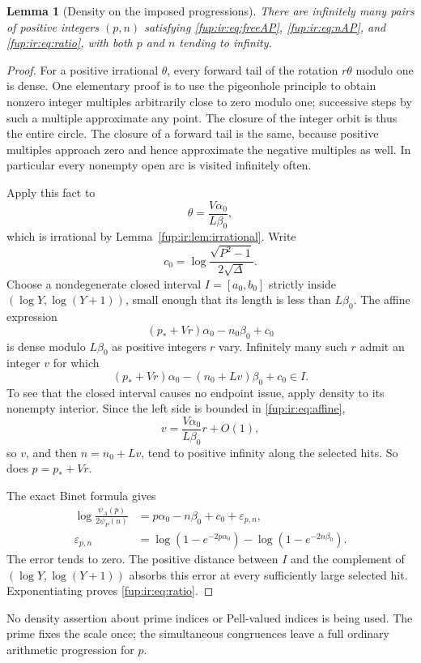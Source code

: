 \documentclass[11pt,letterpaper]{article}
\newtheorem{lemma}[theorem]{Lemma}
\theoremstyle{definition}\newtheorem{definition}[theorem]{Definition}
\theoremstyle{remark}\newtheorem{remark}[theorem]{Remark}
\begin{document}
\begin{lemma}[Density on the imposed progressions]\label{fup:ir:lem:ratio}
There are infinitely many pairs of positive integers $(p,n)$ satisfying \eqref{fup:ir:eq:freeAP}, \eqref{fup:ir:eq:nAP}, and \eqref{fup:ir:eq:ratio}, with both $p$ and $n$ tending to infinity.
\end{lemma}
\begin{proof}
For a positive irrational $\theta$, every forward tail of the rotation $r\theta$ modulo one is dense. One elementary proof is to use the pigeonhole principle to obtain nonzero integer multiples arbitrarily close to zero modulo one; successive steps by such a multiple approximate any point. The closure of the integer orbit is thus the entire circle. The closure of a forward tail is the same, because positive multiples approach zero and hence approximate the negative multiples as well. In particular every nonempty open arc is visited infinitely often.

Apply this fact to
\[
 \theta=\frac{V\alpha_0}{L\beta_0},
\]
which is irrational by Lemma~\ref{fup:ir:lem:irrational}. Write
\[
 c_0=\log\frac{\sqrt{P^2-1}}{2\sqrt\Delta}.
\]
Choose a nondegenerate closed interval $I=[a_0,b_0]$ strictly inside
$(\log Y,\log(Y+1))$, small enough that its length is less than $L\beta_0$. The affine expression
\[
 (p_*+Vr)\alpha_0-n_0\beta_0+c_0
\]
is dense modulo $L\beta_0$ as positive integers $r$ vary. Infinitely many such $r$ admit an integer $v$ for which
\begin{equation}\label{fup:ir:eq:affine}
 (p_*+Vr)\alpha_0-(n_0+Lv)\beta_0+c_0\in I.
\end{equation}
To see that the closed interval causes no endpoint issue, apply density to its nonempty interior. Since the left side is bounded in \eqref{fup:ir:eq:affine},
\[
 v=\frac{V\alpha_0}{L\beta_0}r+O(1),
\]
so $v$, and then $n=n_0+Lv$, tend to positive infinity along the selected hits. So does $p=p_*+Vr$.

The exact Binet formula gives
\begin{align*}
 \log\frac{\psi_A(p)}{2\psi_P(n)}
 &=p\alpha_0-n\beta_0+c_0+\varepsilon_{p,n},\\
 \varepsilon_{p,n}
 &=\log(1-e^{-2p\alpha_0})-\log(1-e^{-2n\beta_0}).
\end{align*}
The error tends to zero. The positive distance between $I$ and the complement of $(\log Y,\log(Y+1))$ absorbs this error at every sufficiently large selected hit. Exponentiating proves \eqref{fup:ir:eq:ratio}.
\end{proof}
No density assertion about prime indices or Pell-valued indices is being used. The prime fixes the scale once; the simultaneous congruences leave a full ordinary arithmetic progression for $p$.
\end{document}
